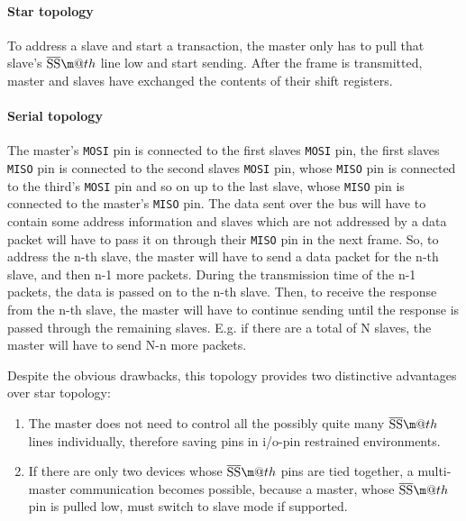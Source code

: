 \documentclass[journal]{IEEEtran}
\makeatletter
\newcommand{\mosi}{\texttt{MOSI}\xspace}
\newcommand{\miso}{\texttt{MISO}\xspace}
\renewcommand{\ss}{\texttt{\textoverline{SS}}\xspace}
\newcommand*{\textoverline}[1]{$\overline{\hbox{#1}}\m@th$}
\makeatother
\begin{document}
\paragraph*{Star topology}
To address a slave and start a transaction, the master only has to pull that slave's \ss line low and start sending. After the frame is transmitted, master and slaves have exchanged the contents of their shift registers.
\paragraph*{Serial topology}
The master's \mosi pin is connected to the first slaves \mosi pin, the first slaves \miso pin is connected to the second slaves \mosi pin, whose \miso pin is connected to the third's \mosi pin and so on up to the last slave, whose \miso pin is connected to the master's \miso pin. The data sent over the bus will have to contain some address information and slaves which are not addressed by a data packet will have to pass it on through their \miso pin in the next frame. So, to address the n-th slave, the master will have to send a data packet for the n-th slave, and then n-1 more packets. During the transmission time of the n-1 packets, the data is passed on to the n-th slave. Then, to receive the response from the n-th slave, the master will have to continue sending until the response is passed through the remaining slaves. E.g. if there are a total of N slaves, the master will have to send N-n more packets.

Despite the obvious drawbacks, this topology provides two distinctive advantages over star topology:
\begin{enumerate}
	\item The master does not need to control all the possibly quite many \ss lines individually, therefore saving pins in i/o-pin restrained environments.
	\item If there are only two devices whose \ss pins are tied together, a multi-master communication becomes possible, because a master, whose \ss pin is pulled low, must switch to slave mode if supported.
\end{enumerate}
\end{document}
